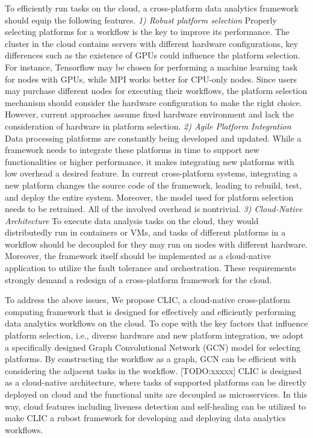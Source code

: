 To efficiently run tasks on the cloud, a cross-platform data analytics framework should equip the following features. \textit{1) Robust platform selection} Properly selecting platforms for a workflow is the key to improve its performance. The cluster in the cloud contains servers with different hardware configurations, key differences such as the existence of GPUs could influence the platform selection. For instance, Tensorflow may be chosen for performing a machine learning task for nodes with GPUs, while MPI works better for CPU-only nodes.  Since users may purchase different nodes for executing their workflows, the platform selection mechanism should consider the hardware configuration to make the right choice. However, current approaches assume fixed hardware environment and lack the consideration of hardware in platform selection.  
\textit{2) Agile Platform Integration} Data processing platforms are constantly being developed and updated. While a framework needs to integrate these platforms in time to support new functionalities or higher performance, it makes integrating new platforms with low overhead a desired feature. In current cross-platform systems, integrating a new platform changes the source code of the framework, leading to rebuild, test, and deploy the entire system. Moreover, the model used for platform selection needs to be retrained. All of the involved overhead is nontrivial. \textit{3) Cloud-Native Architecture} To execute data analysis tasks on the cloud, they would distributedly run in containers or VMs, and tasks of different platforms in a workflow should be decoupled for they may run on nodes with different hardware.
Moreover, the framework itself should be implemented as a cloud-native application to utilize the fault tolerance and orchestration. These requirements strongly demand a redesign of a cross-platform framework for the cloud.



To address the above issues, We propose CLIC, a cloud-native cross-platform computing framework that is designed for effectively and efficiently performing data analytics workflows on the cloud.
To cope with the key factors that influence platform selection, i.e., diverse hardware and new platform integration, we adopt a specifically designed Graph Convolutional Network (GCN) model for selecting platforms. By constructing the workflow as a graph, GCN can be efficient with considering the adjacent tasks in the workflow. [TODO:xxxxx]
CLIC is designed as a cloud-native architecture, where tasks of supported platforms can be directly deployed on cloud and the functional units are decoupled as microservices. In this way, cloud features including liveness detection and self-healing can be utilized to make CLIC a rubost framework for developing and deploying data analytics workflows. 


